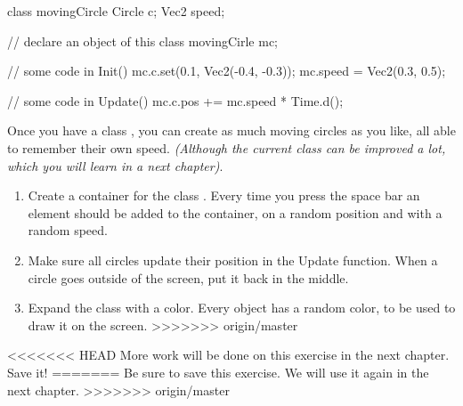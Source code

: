 \begin{code}
class movingCircle {
  Circle c;
  Vec2 speed;
}

// declare an object of this class
movingCirle mc;

// some code in Init()
mc.c.set(0.1, Vec2(-0.4, -0.3));
mc.speed = Vec2(0.3, 0.5);

// some code in Update()
mc.c.pos += mc.speed * Time.d();
\end{code}

Once you have a class , you can create as much moving circles as you like, all able to remember their own speed. \textit{(Although the current class can be improved a lot, which you will learn in a next chapter)}.

\begin{exercise}
\begin{enumerate}
  \item Create a container for the class . Every time you press the space bar an element should be added to the container, on a random position and with a random speed.
	\item Make sure all circles update their position in the Update function. When a circle goes outside of the screen, put it back in the middle.
	\item Expand the class  with a color. Every object has a random color, to be used to draw it on the screen.
>>>>>>> origin/master
	\end{enumerate}
\end{exercise}

\begin{note}
<<<<<<< HEAD
More work will be done on this exercise in the next chapter. Save it!
=======
Be sure to save this exercise. We will use it again in the next chapter.
>>>>>>> origin/master
\end{note}
